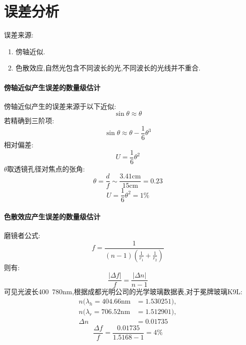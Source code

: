 \documentclass[UTF8]{gapd}
\begin{document}
\section{误差分析}
误差来源:
\begin{enumerate}
  \item 傍轴近似.
  \item 色散效应,自然光包含不同波长的光,不同波长的光线并不重合.
\end{enumerate}
\paragraph{傍轴近似产生误差的数量级估计}
傍轴近似产生的误差来源于以下近似:
\begin{equation}
  \sin\theta \approx \theta
\end{equation}
若精确到三阶项:
\begin{equation}
  \sin\theta \approx \theta -\frac{1}{6}\theta ^3 
\end{equation}
相对偏差:
\begin{equation}
  U=\frac{1}{6}\theta ^2 
\end{equation}
$\theta$取透镜孔径对焦点的张角:
\begin{equation}
  \theta=\frac{d}{f} \sim \frac{3.41\mathrm{cm} }{15\mathrm{cm} }= 0.23
\end{equation}
\begin{equation}
  U=\frac{1}{6}\theta ^2=1\%
\end{equation}
\paragraph{色散效应产生误差的数量级估计}
磨镜者公式:
\begin{equation}
  f=\frac{1}{(n-1)(\frac{1}{r_1}+\frac{1}{r_2}  )} 
\end{equation}
则有:
\begin{equation}
  \frac{|\Delta f|}{f} =\frac{|\Delta n|}{n-1} 
\end{equation}
可见光波长400~780nm,根据成都光明公司的光学玻璃数据表,对于冕牌玻璃K9L:
\begin{align*}
  n(\lambda_h=404.66\mathrm{nm} &=1.530251),\\
  n(\lambda_r=706.52\mathrm{nm} &=1.512901),\\
  \Delta n&=0.01735
\end{align*}
\begin{equation}
  \frac{\Delta f}{f}=\frac{0.01735}{1.5168-1}=4\%  
\end{equation}
\end{document}
